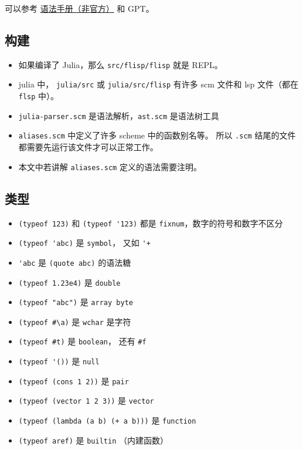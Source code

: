 
可以参考 \href{https://code.google.com/archive/p/femtolisp/wikis/Manual.wiki}{语法手册（非官方）} 和 GPT。

\subsection{构建}
\begin{itemize}
\item 如果编译了 Julia，那么 \verb`src/flisp/flisp` 就是 REPL。
\item julia 中， \verb`julia/src` 或 \verb`julia/src/flisp` 有许多 scm 文件和 lsp 文件（都在 \verb`flsp` 中）。
\item \verb`julia-parser.scm` 是语法解析，\verb`ast.scm` 是语法树工具
\item \verb`aliases.scm` 中定义了许多 scheme 中的函数别名等。 所以 \verb`.scm` 结尾的文件都需要先运行该文件才可以正常工作。
\item 本文中若讲解 \verb`aliases.scm` 定义的语法需要注明。
\end{itemize}

\subsection{类型}
\begin{itemize}
\item \verb`(typeof 123)` 和 \verb`(typeof '123)` 都是 \verb`fixnum`，数字的符号和数字不区分
\item \verb`(typeof 'abc)` 是 \verb`symbol`， 又如 \verb`'+`
\item \verb`'abc` 是 \verb`(quote abc)` 的语法糖
\item \verb`(typeof 1.23e4)` 是 \verb`double`
\item \verb`(typeof "abc")` 是 \verb`array byte`
\item \verb`(typeof #\a)` 是 \verb`wchar` 是字符
\item \verb`(typeof #t)` 是 \verb`boolean`， 还有 \verb`#f`
\item \verb`(typeof '())` 是 \verb`null`
\item \verb`(typeof (cons 1 2))` 是 \verb`pair`
\item \verb`(typeof (vector 1 2 3))` 是 \verb`vector`
\item \verb`(typeof (lambda (a b) (+ a b)))` 是 \verb`function`
\item \verb`(typeof aref)` 是 \verb`builtin` （内建函数）
\end{itemize}

